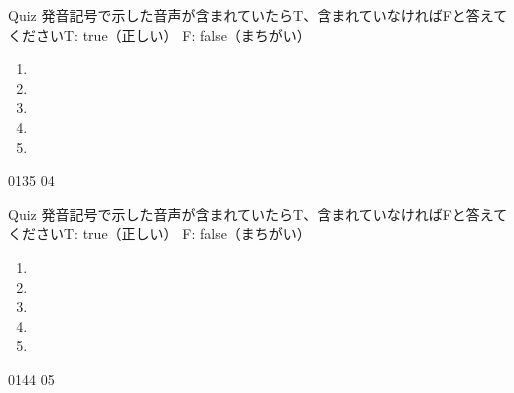 \documentclass[aspectratio=169, xcolor={dvipsnames,table}]{beamer}
\begin{document}
\begin{frame}[plain]{Quiz }
  \large 発音記号で示した音声が含まれていたらT、含まれていなければFと答えてください\hfill{}{\scriptsize T: true（正しい）\hspace{5pt} F: false（まちがい）}
  \begin{enumerate}
    \item \mbox{}\hspace{1\zw}

    \item \mbox{}\hspace{1\zw}

    \item \mbox{}\visible<4->{T}\hspace{1\zw}

    \item \mbox{}\hspace{1\zw}

    \item \mbox{}\hspace{1\zw}
  \end{enumerate}

  \hfill{\tiny 0135}\,{\scriptsize {}\,04}
\end{frame}
\begin{frame}[plain]{Quiz }
  \large 発音記号で示した音声が含まれていたらT、含まれていなければFと答えてください\hfill{}{\scriptsize T: true（正しい）\hspace{5pt} F: false（まちがい）}
  \begin{enumerate}
    \item \mbox{}\hspace{1\zw}

    \item \mbox{}\visible<3->{T}\hspace{1\zw}

    \item \mbox{}\hspace{1\zw}

    \item \mbox{}\hspace{1\zw}

    \item \mbox{}\hspace{1\zw}
  \end{enumerate}

  \hfill{\tiny 0144}\,{\scriptsize {}\,05}
\end{frame}
\end{document}

